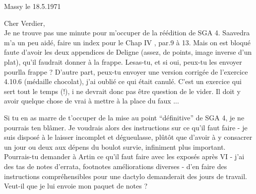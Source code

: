 \begin{flushright}
Massy le 18.5.1971\\
\end{flushright}
Cher Verdier,\\

Je ne trouve pas une minute pour m'occuper de la réédition de SGA 4. Saavedra m'a un peu aidé,  faire un index pour le Chap IV , par.9 à 13. Mais on est bloqué faute d'avoir les deux appendices de Deligne (assez, de points, image inverse d'un plat), qu'il faudrait donner à la frappe. Lesas-tu, et si oui, peux-tu les envoyer pourlla frappe ? D'autre part, peux-tu envoyer une version corrigée de l'exercice 4.10.6 (médaille chocolat), j'ai  oublié ce qui était canulé. C'est un exercice qui sert tout le temps (!), i ne devrait donc pas être question de le vider. Il doit y avoir quelque chose de vrai à mettre à la place du faux ...

Si tu en as marre de t'occuper de la mise au point ``définitive'' de SGA 4, je ne pourrais ten blâmer. Je voudrais alors des instructions sur ce qu'il faut faire - je suis disposé à le laisser incomplet et dégueulasse, plûtôt que d'avoir à  y consacrer un jour ou deux aux dépens du boulot survie, infiniment plus important. Pourrais-tu demander à Artin ce qu'il faut faire avec les exposés après VI - j'ai des tas de notes d'errata, footnotes améliorations diverses - d'en faire des instructions compréhensibles pour une dactylo demanderait des jours de travail. Veut-il que je lui envoie mon paquet de notes ?
